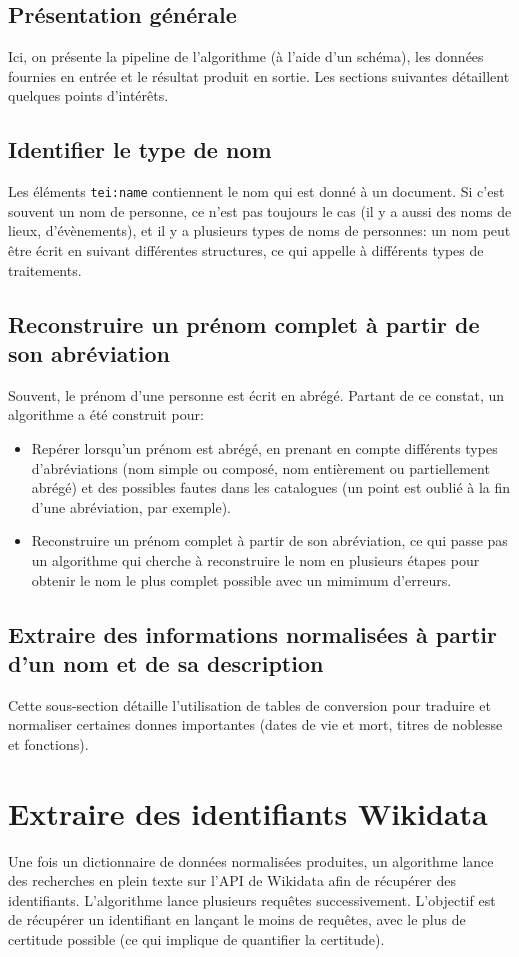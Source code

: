 \documentclass[a4paper, 12pt, twoside]{book}
\begin{document}
\subsection{Présentation générale}
Ici, on présente la pipeline de l'algorithme (à l'aide d'un schéma), les données fournies en entrée et le résultat produit en sortie. Les sections suivantes détaillent quelques points d'intérêts.

\subsection{Identifier le type de nom}
Les éléments \texttt{tei:name} contiennent le nom qui est donné à un document. Si c'est souvent un nom de personne, ce n'est pas toujours le cas (il y a aussi des noms de lieux, d'évènements), et il y a plusieurs types de noms de personnes: un nom peut être écrit en suivant différentes structures, ce qui appelle à différents types de traitements.

\subsection{Reconstruire un prénom complet à partir de son abréviation}
Souvent, le prénom d'une personne est écrit en abrégé. Partant de ce constat, un algorithme a été construit pour:
\begin{itemize}
	\item Repérer lorsqu'un prénom est abrégé, en prenant en compte différents types d'abréviations (nom simple ou composé, nom entièrement ou partiellement abrégé) et des possibles fautes dans les catalogues (un point est oublié à la fin d'une abréviation, par exemple).
	\item Reconstruire un prénom complet à partir de son abréviation, ce qui passe pas un algorithme qui cherche à reconstruire le nom en plusieurs étapes pour obtenir le nom le plus complet possible avec un mimimum d'erreurs.
\end{itemize}

\subsection{Extraire des informations normalisées à partir d'un nom et de sa description}
Cette sous-section détaille l'utilisation de tables de conversion pour traduire et normaliser certaines donnes importantes (dates de vie et mort, titres de noblesse et fonctions).

\section{Extraire des identifiants Wikidata}
Une fois un dictionnaire de données normalisées produites, un algorithme lance des recherches en plein texte sur l'API de Wikidata afin de récupérer des identifiants. L'algorithme lance plusieurs requêtes successivement. L'objectif est de récupérer un identifiant en lançant le moins de requêtes, avec le plus de certitude possible (ce qui implique de quantifier la certitude).
\end{document}
